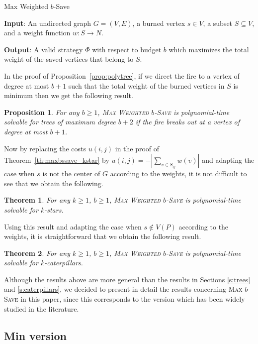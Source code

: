 \documentclass[10pt]{article}
\newcommand{\probtitle}[1]{\textsc{#1}}
\newtheorem{theorem}{Theorem}
\newtheorem{proposition}{Proposition}
\begin{document}
\noindent 
{\sc Max Weighted $b$-Save}

\noindent\textbf{Input}: An undirected graph $G=(V,E)$, a burned vertex $s\in V$, a subset $S \subseteq V$, and a weight function $w:S \to N$.

\noindent\textbf{Output}: A valid strategy $\Phi$  with respect to budget $b$ which maximizes the total weight of the saved vertices that belong to $S$.\\

\medskip

In the proof of Proposition~\ref{prop:polytree}, if we direct the fire to a vertex of degree at most $b+1$ such that the total weight of the burned vertices in $S$ is minimum then we get the following result.

\begin{proposition}
For any $b\geq 1$, \probtitle{Max Weighted $b$-Save} is polynomial-time solvable for trees of maximum degree $b+2$ if the fire breaks out at a vertex of degree at most $b+1$.
\end{proposition}

Now by replacing the costs $u(i,j)$ in the proof of Theorem~\ref{th:maxbssave_kstar} by $u(i,j) = - |\sum_{v \in S_{ij}} w(v)|$ and adapting the case when $s$ is not the center of $G$ according to the weights, it is not difficult to see that we obtain the following.

\begin{theorem}
For any $k\geq 1$, $b\geq 1$, \probtitle{Max Weighted $b$-Save} is polynomial-time solvable for $k$-stars.
\end{theorem}

Using this result and adapting the case when $s \notin V(P)$ according to the weights, it is straightforward that we obtain the following result.

\begin{theorem}
For any $k\geq 1$, $b\geq 1$, \probtitle{Max Weighted $b$-Save} is polynomial-time solvable for $k$-caterpillars.
\end{theorem}

Although the results above are more general than the results in Sections \ref{s:trees} and \ref{s:caterpillars}, we decided to present in detail the results concerning \probtitle{Max $b$-Save} in this paper, since this corresponds to the version which has been widely studied in the literature.

\subsection{Min version}
\end{document}
